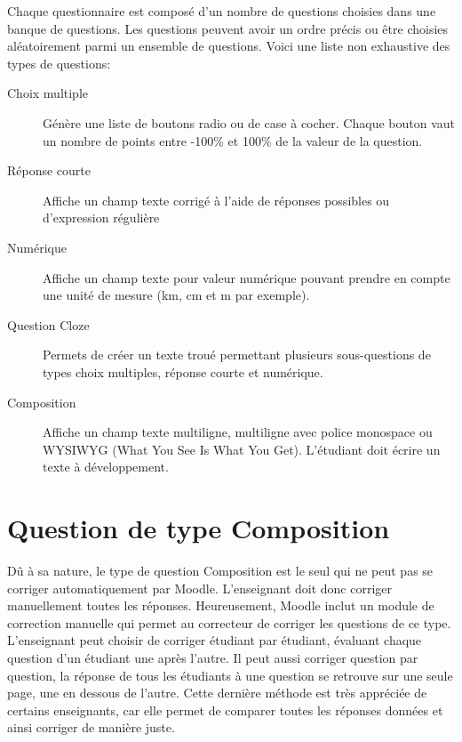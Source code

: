 Chaque questionnaire est composé d'un nombre de questions choisies dans une banque de questions. Les questions peuvent avoir un ordre précis ou être choisies aléatoirement parmi un ensemble de questions. Voici une liste non exhaustive des types de questions:

\begin{description}
  \item[Choix multiple]
  
  Génère une liste de boutons radio ou de case à cocher. Chaque bouton vaut un nombre de points entre -100\% et 100\% de la valeur de la question.
  
  \item[Réponse courte]
  
  Affiche un champ texte corrigé à l'aide de réponses possibles ou d'expression régulière
  
  \item[Numérique]
  
  Affiche un champ texte pour valeur numérique pouvant prendre en compte une unité de mesure (km, cm et m par exemple).
  
  \item[Question Cloze]
  
  Permets de créer un texte troué permettant plusieurs sous-questions de types choix multiples, réponse courte et numérique.
  
  \item[Composition]
  
  Affiche un champ texte multiligne, multiligne avec police monospace ou WYSIWYG (What You See Is What You Get). L'étudiant doit écrire un texte à développement.
\end{description}

\section{Question de type Composition}

Dû à sa nature, le type de question Composition est le seul qui ne peut pas se corriger automatiquement par Moodle. L'enseignant doit donc corriger manuellement toutes les réponses. Heureusement, Moodle inclut un module de correction manuelle qui permet au correcteur de corriger les questions de ce type. L'enseignant peut choisir de corriger étudiant par étudiant, évaluant chaque question d'un étudiant une après l'autre. Il peut aussi corriger question par question, la réponse de tous les étudiants à une question se retrouve sur une seule page, une en dessous de l'autre. Cette dernière méthode est très appréciée de certains enseignants, car elle permet de comparer toutes les réponses données et ainsi corriger de manière juste.

